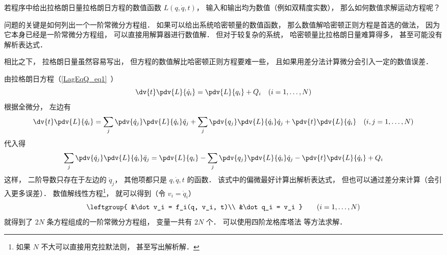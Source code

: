 
\begin{issues}
\issueDraft
\end{issues}


若程序中给出拉格朗日量拉格朗日方程的数值函数 $L(q, \dot q, t)$， 输入和输出均为数值（例如双精度实数）， 那么如何数值求解运动方程呢？

问题的关键是如何列出一个一阶常微分方程组． 如果可以给出系统哈密顿量的数值函数， 那么数值解哈密顿正则方程是首选的做法， 因为它本身已经是一阶常微分方程组， 可以直接用解算器进行数值解． 但对于较复杂的系统， 哈密顿量比拉格朗日量难算得多， 甚至可能没有解析表达式．

相比之下， 拉格朗日量虽然容易写出， 但方程的数值解比哈密顿正则方程要难一些， 且如果用差分法计算微分会引入一定的数值误差．

由拉格朗日方程（\autoref{LagEqQ_eq1}~）
\begin{equation}
\dv{t} \pdv{L}{\dot q_i} = \pdv{L}{q_i} + Q_i
\quad (i=1,\dots,N)
\end{equation}
根据全微分， 左边有
\begin{equation}
\dv{t} \pdv{L}{\dot q_i} = \sum_j\pdv{\dot q_j}\pdv{L}{\dot q_i}\ddot q_j + \sum_j\pdv{q_j}\pdv{L}{\dot q_i}\dot q_j + \pdv{t}\pdv{L}{\dot q_i} \quad (i,j=1,\dots,N)
\end{equation}
代入得
\begin{equation}
\sum_j\pdv{\dot q_j}\pdv{L}{\dot q_i}\ddot q_j = \pdv{L}{q_i} - \sum_j\pdv{q_j}\pdv{L}{\dot q_i}\dot q_j - \pdv{t}\pdv{L}{\dot q_i} + Q_i
\end{equation}
这样， 二阶导数只存在于左边的 $\ddot q_j$， 其他项都只是 $q,\dot q, t$ 的函数． 该式中的偏微最好计算出解析表达式， 但也可以通过差分来计算（会引入更多误差）． 数值解线性方程\footnote{如果 $N$ 不大可以直接用克拉默法则， 甚至写出解析解．}， 就可以得到（令 $v_i = \dot q_i$）
\begin{equation}
\leftgroup{
&\dot v_i = f_i(q, v_i, t)\\
&\dot q_i = v_i
}\qquad (i = 1,\dots,N)
\end{equation}
就得到了 $2N$ 条方程组成的一阶常微分方程组， 变量一共有 $2N$ 个． 可以使用四阶龙格库塔法 等方法求解．


